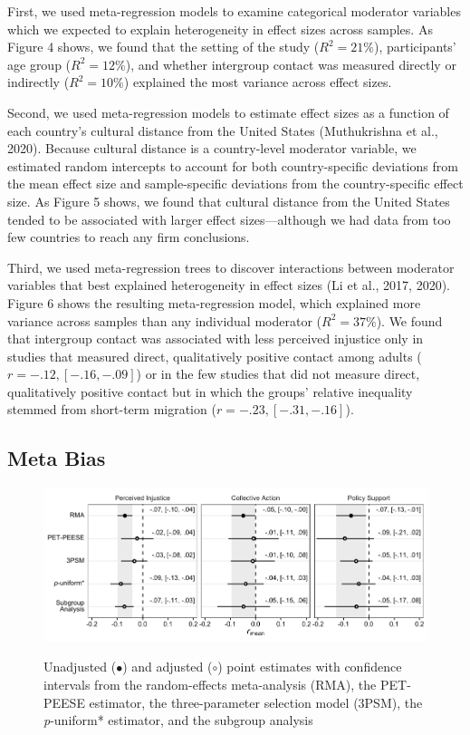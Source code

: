 \documentclass[12pt, letterpaper]{article}
\begin{document}
First, we used meta-regression models to examine categorical moderator
variables which we expected to explain heterogeneity in effect sizes
across samples. As Figure 4 shows, we found that the setting of the
study (\(R^2 = 21\%\)), participants' age group (\(R^2 = 12\%\)), and
whether intergroup contact was measured directly or indirectly
(\(R^2 = 10\%\)) explained the most variance across effect sizes.

Second, we used meta-regression models to estimate effect sizes as a
function of each country's cultural distance from the United States
(Muthukrishna et al., 2020). Because cultural distance is a
country-level moderator variable, we estimated random intercepts to
account for both country-specific deviations from the mean effect size
and sample-specific deviations from the country-specific effect size. As
Figure 5 shows, we found that cultural distance from the United States
tended to be associated with larger effect sizes---although we had data
from too few countries to reach any firm conclusions.

Third, we used meta-regression trees to discover interactions between
moderator variables that best explained heterogeneity in effect sizes
(Li et al., 2017, 2020). Figure 6 shows the resulting meta-regression
model, which explained more variance across samples than any individual
moderator (\(R^2 = 37\%\)). We found that intergroup contact was
associated with less perceived injustice only in studies that measured
direct, qualitatively positive contact among adults
(\(r = -.12, [-.16, -.09]\)) or in the few studies that did not measure
direct, qualitatively positive contact but in which the groups' relative
inequality stemmed from short-term migration
(\(r = -.23, [-.31, -.16]\)).

\hypertarget{meta-bias}{%
\subsection{Meta Bias}\label{meta-bias}}

\begin{figure}
\centering
\caption{Unadjusted ($\bullet$) and adjusted ($\circ$) point estimates with confidence intervals from the random-effects meta-analysis (RMA), the PET-PEESE estimator, the three-parameter selection model (3PSM), the \textit{p}-uniform* estimator, and the subgroup analysis}
\includegraphics[scale=1]{../figures/figure-7}
\label{fig:f7}
\end{figure}
\end{document}
